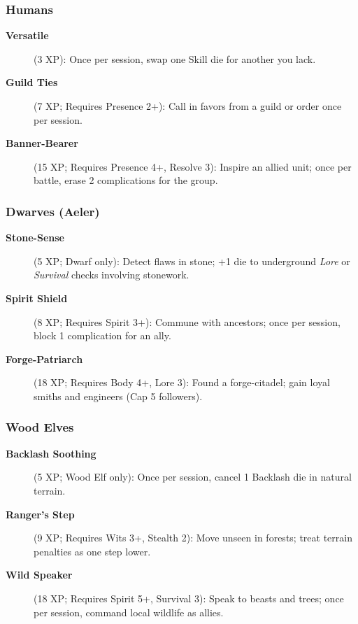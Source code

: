 \subsubsection{Humans}
\label{subsubsec:human-talents}

\begin{description}
\item[\textbf{Versatile}] (3 XP): Once per session, swap one Skill die for another you lack.
\item[\textbf{Guild Ties}] (7 XP; Requires Presence 2+): Call in favors from a guild or order once per session.
\item[\textbf{Banner-Bearer}] (15 XP; Requires Presence 4+, Resolve 3): Inspire an allied unit; once per battle, erase 2 complications for the group.
\end{description}

\subsubsection{Dwarves (Aeler)}
\label{subsubsec:dwarf-talents}

\begin{description}
\item[\textbf{Stone-Sense}] (5 XP; Dwarf only): Detect flaws in stone; +1 die to underground \emph{Lore} or \emph{Survival} checks involving stonework.
\item[\textbf{Spirit Shield}] (8 XP; Requires Spirit 3+): Commune with ancestors; once per session, block 1 complication for an ally.
\item[\textbf{Forge-Patriarch}] (18 XP; Requires Body 4+, Lore 3): Found a forge-citadel; gain loyal smiths and engineers (Cap 5 followers).
\end{description}

\subsubsection{Wood Elves}
\label{subsubsec:wood-elf-talents}

\begin{description}
\item[\textbf{Backlash Soothing}] (5 XP; Wood Elf only): Once per session, cancel 1 Backlash die in natural terrain.
\item[\textbf{Ranger's Step}] (9 XP; Requires Wits 3+, Stealth 2): Move unseen in forests; treat terrain penalties as one step lower.
\item[\textbf{Wild Speaker}] (18 XP; Requires Spirit 5+, Survival 3): Speak to beasts and trees; once per session, command local wildlife as allies.
\end{description}

